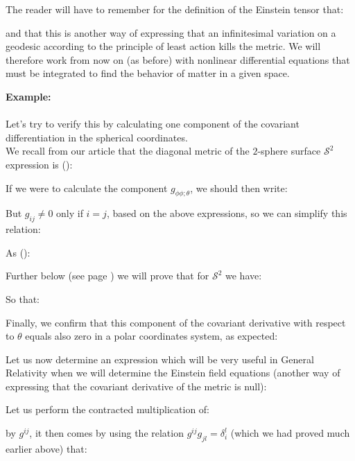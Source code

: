	\begin{tcolorbox}[title=Remark,colframe=black,arc=10pt]
	The reader will have to remember for the definition of the Einstein tensor that:
	
	and that this is another way of expressing that an infinitesimal variation on a geodesic according to the principle of least action kills the metric. We will therefore work from now on (as before) with nonlinear differential equations that must be integrated to find the behavior of matter in a given space.
	\end{tcolorbox}
	\begin{tcolorbox}[colframe=black,colback=white,sharp corners]
	\textbf{{\Large {}}Example:}\\\\
	Let's try to verify this by calculating one component of the covariant differentiation in the spherical coordinates.\\
	
	We recall from our article that the diagonal metric of the $2$-sphere surface $\mathcal{S}^2$ expression is ():
	
	If we were to calculate the component $g_{\phi\phi;\theta}$, we should then write:
	
	But $g_{ij}\neq 0$ only if $i=j$, based on the above expressions, so we can simplify this relation:
	
	As ():
	
	 Further below (see page \pageref{Christoffel symbol 2-sphere}) we will prove that for $\mathcal{S}^2$ we have:
	
	So that:
	
	Finally, we confirm that this component of the covariant derivative with respect to $\theta$ equals also zero in a polar coordinates system, as expected:
	
	\end{tcolorbox}
	Let us now determine an expression which will be very useful in General Relativity when we will determine the Einstein field equations (another way of expressing that the covariant derivative of the metric is null):

	Let us perform the contracted multiplication of:
	
	by $g^{ij}$, it then comes by using the relation $g^{ij}g_{jl}=\delta_i^l$ (which we had proved much earlier above) that:
	
